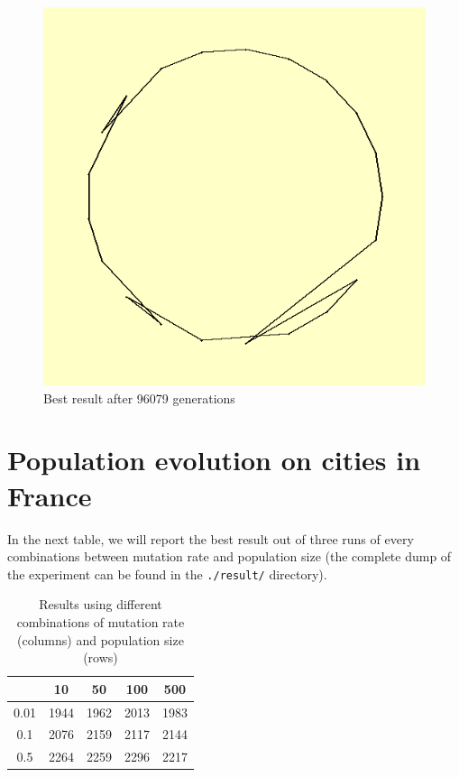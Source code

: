 \documentclass{article}
\begin{document}
\begin{figure}[!ht]
\includegraphics[width=\textwidth]{../result/exercise2/best.png}
\caption{Best result after 96079 generations}
\end{figure}

\newpage
\section{Population evolution on cities in France}
In the next table, we will report the best result out of three runs of every combinations between mutation rate and population size (the complete dump of the experiment can be found in the \texttt{./result/} directory).

\begin{table}
\centering
\caption{Results using different combinations of mutation rate (columns) and population size (rows)}
\begin{tabular}{c||c|c|c|c}
& 10 & 50 & 100 & 500\\
\hline
0.01 & 1944 & 1962 & 2013 & 1983\\
\hline
0.1 & 2076 & 2159 & 2117 & 2144\\
\hline
0.5 & 2264 & 2259 & 2296 & 2217\\
\hline
\end{tabular}
\end{table}
\end{document}
